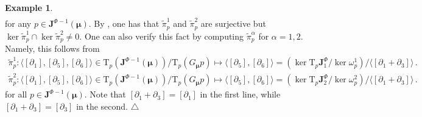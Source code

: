 \documentclass[11pt]{article}
\theoremstyle{plain}
\theoremstyle{definition}
\newtheorem{example}[theorem]{Example}
\newcommand{\T}{\mathrm{T}}
\newcommand\xqed[1]{%
    \leavevmode\unskip\penalty9999 \hbox{}\nobreak\hfill
	\quad\hbox{#1}}
\newcommand\demo{\xqed{$\triangle$}}
\numberwithin{equation}{section}
\begin{document}
\begin{example}
\begin{multline*}
\end{multline*}
for any $p\in \mathbf{J}^{\Phi-1}(\bm\mu)$. By \cite[Lemmas 3.15 and 3.16]{MRSV_15}, one has that $\widetilde{\pi}^1_p$ and 
$\widetilde{\pi}^2_p$ are surjective but $\ker\widetilde{\pi}^1_p\cap \ker\widetilde{\pi}^2_p\neq 0$. One can also verify this fact by computing $\widetilde{\pi}_p^\alpha$ for $\alpha=1,2$. Namely, this follows from
\[
\begin{gathered}
\widetilde{\pi}_p^1:\langle[\partial_1],[\partial_5],[\partial_6]\rangle\in \T_p(\mathbf{J}^{\Phi-1}(\bm\mu))/\T_p(G_{\bm\mu} p)\longmapsto \langle [\partial_5],[\partial_6]\rangle=(\ker \T_p\mathbf{J}^\Phi_1/\ker \omega_p^1)/\langle [\partial_1+\partial_3]\rangle\,.\\
\widetilde{\pi}_p^2:\langle[\partial_1],[\partial_5],[\partial_6]\rangle\in \T_p(\mathbf{J}^{\Phi-1}(\bm\mu))/\T_p(G_{\bm\mu} p)\longmapsto \langle [\partial_5],[\partial_6]\rangle=(\ker \T_p\mathbf{J}^\Phi_2/\ker \omega_p^2)/\langle [\partial_1+\partial_3]\rangle\,.
\end{gathered}
\]
for all $p\in\mathbf{J}^{\Phi-1}(\bm\mu)$. Note that $[\partial_1+\partial_3]=[\partial_1]$ in the first line, while $[\partial_1+\partial_3]=[\partial_3]$ in the second.
\demo
\end{example}
\end{document}
